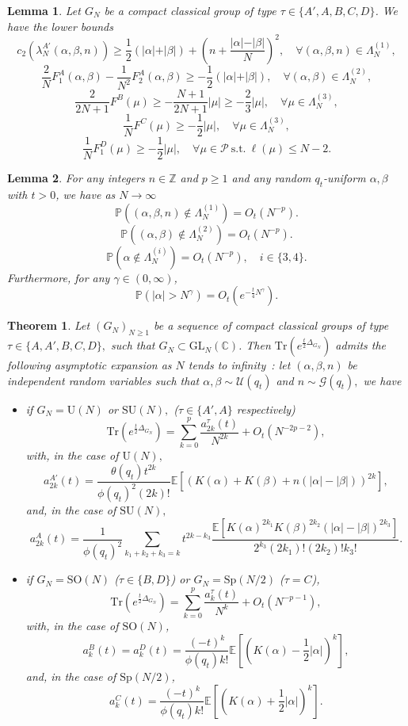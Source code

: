\documentclass[10pt,a4paper]{amsart}
\newtheorem{lemma}{Lemma}
\newtheorem{theorem}{Theorem}
\newcommand\C{\mathbb{C}}
\newcommand\GL{{\mathrm{GL}}}
\newcommand\Gfr{\mathscr{G}}
\newcommand\Pbb{\mathbb{P}}
\newcommand\Pfr{\mathscr{P}}
\newcommand\SO{{\mathrm{SO}}}
\newcommand\SU{{\mathrm{SU}}}
\newcommand\Sp{{\mathrm{Sp}}}
\newcommand\Tr{\mathrm{Tr}}
\newcommand\U{{\mathrm U}}
\newcommand\Ufr{\mathscr{U}}
\newcommand\Z{{\mathbb Z}}
\begin{document}
\begin{lemma}\label{lem:lb-casimirs}
Let $G_N$ be a compact classical group of type $\tau\in\{A',A,B,C,D\}$. We have the lower bounds
\[
c_2(\lambda_N^{A'}(\alpha,\beta,n)) \geq \frac12(\vert\alpha\vert+\vert\beta\vert)+\left(n+\frac{\vert\alpha\vert-\vert\beta\vert}{N}\right)^2,\quad \forall (\alpha,\beta,n)\in\Lambda_N^{(1)},
\]
\[
\frac{2}{N}F_1^A(\alpha,\beta)-\frac{1}{N^2}F_2^A(\alpha,\beta)\geq -\frac12(\vert\alpha\vert+\vert\beta\vert),\quad  \forall (\alpha,\beta)\in\Lambda_N^{(2)},
\]
\[
\frac{2}{2N+1}F^B(\mu)\geq -\frac{N+1}{2N+1}\vert\mu\vert \geq -\frac{2}{3}\vert\mu\vert ,\quad \forall \mu\in\Lambda_N^{(3)},
\]
\[
\frac{1}{N}F^C(\mu)\geq-\frac12\vert\mu\vert,\quad \forall\mu\in\Lambda_N^{(3)},
\]
\[
\frac{1}{N}F_1^D(\mu)\geq-\frac12\vert\mu\vert,\quad \forall \mu\in\Pfr\ \text{s.t.}\ \ell(\mu)\leq N-2.
\]
\end{lemma}

\begin{lemma}\label{lem:dev_ineq_bis}
For any integers $n\in\Z$ and $p\geq 1$ and any random $q_t$-uniform $\alpha,\beta$ with $t>0$, we have as $N\to\infty$
\[
\Pbb((\alpha,\beta,n)\notin\Lambda_N^{(1)})=O_t(N^{-p}).
\]
\[
\Pbb((\alpha,\beta)\notin\Lambda_N^{(2)})=O_t(N^{-p}).
\]
\[
\Pbb(\alpha\notin\Lambda_N^{(i)})=O_t(N^{-p}),\quad i\in\{3,4\}.
\]
Furthermore, for any $\gamma\in(0,\infty)$,
\[
\Pbb(\vert\alpha\vert>N^\gamma)=O_t(e^{-\frac{t}{4}N^\gamma}).
\]
\end{lemma}

\begin{theorem}
 \label{thm:asympt_expansion_detailed}
 Let $(G_N)_{N \geq 1}$ be a sequence of compact classical groups of type $\tau \in \{A, A', B, C, D\},$ such that $G_N\subset\GL_N(\C)$. Then $\Tr(e^{\frac{t}{2}\Delta_{G_N}})$ admits the following asymptotic expansion as $N$ tends to infinity~: let $(\alpha, \beta,n)$ be independent random variables such that $\alpha, \beta \sim \Ufr(q_t)$ and $n \sim  \Gfr(q_t),$ we have
 \begin{itemize}
  \item if $G_N = \U(N)$ or $\SU(N),$ ($\tau \in \{A', A\}$ respectively)
  \[ \Tr(e^{\frac{t}{2}\Delta_{G_N}}) = \sum_{k=0}^p \frac{a_{2k}^\tau(t)}{N^{2k}} + O_t(N^{-2p-2}), \]
  with, in the case of $\U(N),$
  \[ a_{2k}^{A'}(t) = \frac{\theta(q_t) t^{2k}}{\phi(q_t)^2 (2k)!} \mathbb E\left[\left(K(\alpha) + K(\beta) +n (|\alpha|-|\beta|)\right)^{2k}\right], \]
  and, in the case of $\SU(N),$
   \[ a_{2k}^A(t) = \frac{1}{\phi(q_t)^2} \sum_{k_1+k_2+k_3 = k} t^{2k-k_3}\frac{\mathbb E\left[K(\alpha)^{2k_1} K(\beta)^{2k_2}(|\alpha|-|\beta|)^{2k_3}\right]}{2^{k_3}(2k_1)!(2k_2)!k_3!}. \]
 \item if $G_N = \SO(N)$ ($\tau \in\{B,D\}$) or $G_N=\Sp(N/2)$ ($\tau=C$),
\[ \Tr(e^{\frac{t}{2}\Delta_{G_N}}) = \sum_{k=0}^p \frac{a_{k}^\tau(t)}{N^{k}} + O_t(N^{-p-1}), \]
with, in the case of $\SO(N)$,
\[  a_{k}^{B}(t) = a_k^D(t)= \frac{(-t)^{k}}{\phi(q_t) k!} \mathbb E\left[\left(K(\alpha) - \frac 1 2 |\alpha|\right)^{k}\right],\]
and, in the case of $\Sp(N/2)$,
\[  a_{k}^{C}(t) = \frac{(-t)^{k}}{\phi(q_t) k!} \mathbb E\left[\left(K(\alpha) + \frac 1 2 |\alpha|\right)^{k}\right].\]
\end{itemize}
\end{theorem}
\end{document}

